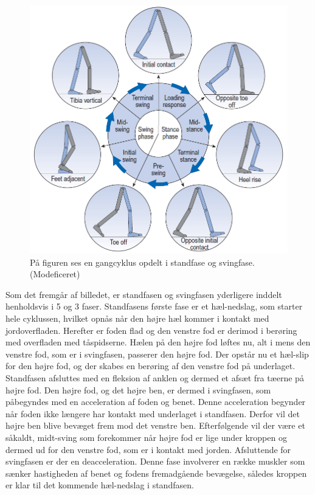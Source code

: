 \begin{figure}[H]
	\centering
	\includegraphics[scale=0.5]{figures/bProblemloesning/gang_cyklus2.png}
	\caption{På figuren ses en gangcyklus opdelt i standfase og svingfase. \citep{Whittle1990} (Modeficeret)}
	\label{fig:gang_cyklus}
\end{figure}
	
Som det fremgår af billedet, er standfasen og svingfasen yderligere inddelt henholdsvis i 5 og 3 faser. \newline
Standfasens første fase er et hæl-nedslag, som starter hele cyklussen, hvilket opnås når den højre hæl kommer i kontakt med jordoverfladen. Herefter er foden flad og den venstre fod er derimod i berøring med overfladen med tåspidserne. Hælen på den højre fod løftes nu, alt i mens den venstre fod, som er i svingfasen, passerer den højre fod. Der opstår nu et hæl-slip for den højre fod, og der skabes en berøring af den venstre fod på underlaget. Standfasen afsluttes med en fleksion af anklen og dermed et afsæt fra tæerne på højre fod.  \citep{VaughanDavisOConnor1992,Whittle1990}  \newline
Den højre fod, og det højre ben, er dermed i svingfasen, som påbegyndes med en acceleration af foden og benet. Denne acceleration begynder når foden ikke længere har kontakt med underlaget i standfasen. Derfor vil det højre ben blive bevæget frem mod det venstre ben. Efterfølgende vil der være et såkaldt, midt-sving som forekommer når højre fod er lige under kroppen og dermed ud for den venstre fod, som er i kontakt med jorden. Afsluttende for svingfasen er der en deacceleration. Denne fase involverer en række muskler som sænker hastigheden af benet og fodens fremadgående bevægelse, således kroppen er klar til det kommende hæl-nedslag i standfasen. \citep{VaughanDavisOConnor1992,Whittle1990}

